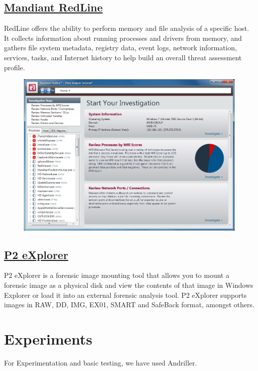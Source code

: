 \documentclass[11pt]{article}
\begin{document}
\subsection{\href{https://fireeye.market/apps/211364}{Mandiant RedLine}}

RedLine offers the ability to perform memory and file analysis of a specific host. It collects information about running processes and drivers from memory, and gathers file system metadata, registry data, event logs, network information, services, tasks, and Internet history to help build an overall threat assessment profile.

\begin{figure}[H]
    \centering
    \includegraphics[width=.85\textwidth]{img3File.png}
    \caption{}
\end{figure}

\subsection{\href{https://www.p2energysolutions.com/p2-explorer}{P2 eXplorer}}

P2 eXplorer is a forensic image mounting tool that allows you to mount a forensic image as a physical disk and view the contents of that image in Windows Explorer or load it into an external forensic analysis tool. P2 eXplorer supports images in RAW, DD, IMG, EX01, SMART and SafeBack format, amongst others.

\section{Experiments}

For Experimentation and basic testing, we have used Andriller.
\end{document}
